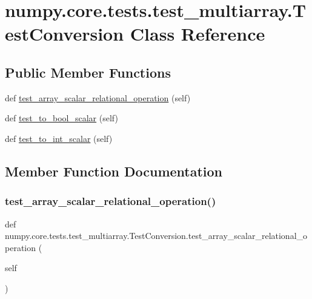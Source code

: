 \hypertarget{classnumpy_1_1core_1_1tests_1_1test__multiarray_1_1TestConversion}{}\section{numpy.\+core.\+tests.\+test\+\_\+multiarray.\+Test\+Conversion Class Reference}
\label{classnumpy_1_1core_1_1tests_1_1test__multiarray_1_1TestConversion}
\subsection*{Public Member Functions}
\begin{DoxyCompactItemize}
\item 
def \hyperlink{classnumpy_1_1core_1_1tests_1_1test__multiarray_1_1TestConversion_ae11f32da0b81c2714c194e85914a6515}{test\+\_\+array\+\_\+scalar\+\_\+relational\+\_\+operation} (self)
\item 
def \hyperlink{classnumpy_1_1core_1_1tests_1_1test__multiarray_1_1TestConversion_abb3a7e868bc0c22a48be65752c4b1425}{test\+\_\+to\+\_\+bool\+\_\+scalar} (self)
\item 
def \hyperlink{classnumpy_1_1core_1_1tests_1_1test__multiarray_1_1TestConversion_ac71c596e01ce98a0b804b235f66a7fbe}{test\+\_\+to\+\_\+int\+\_\+scalar} (self)
\end{DoxyCompactItemize}


\subsection{Member Function Documentation}
\mbox{\label{classnumpy_1_1core_1_1tests_1_1test__multiarray_1_1TestConversion_ae11f32da0b81c2714c194e85914a6515}} 
\subsubsection{\texorpdfstring{test\+\_\+array\+\_\+scalar\+\_\+relational\+\_\+operation()}{test\_array\_scalar\_relational\_operation()}}
{\footnotesize\ttfamily def numpy.\+core.\+tests.\+test\+\_\+multiarray.\+Test\+Conversion.\+test\+\_\+array\+\_\+scalar\+\_\+relational\+\_\+operation (\begin{DoxyParamCaption}\item[{}]{self }\end{DoxyParamCaption})}


